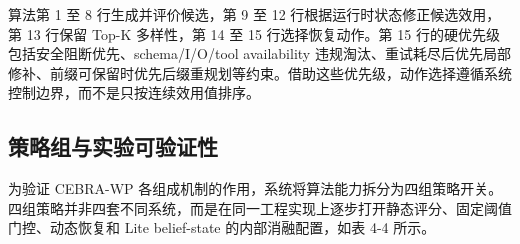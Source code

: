 算法第 1 至 8 行生成并评价候选，第 9 至 12
行根据运行时状态修正候选效用，第 13 行保留 Top-K 多样性，第 14 至 15
行选择恢复动作。第 15 行的硬优先级包括安全阻断优先、schema/I/O/tool
availability
违规淘汰、重试耗尽后优先局部修补、前缀可保留时优先后缀重规划等约束。借助这些优先级，动作选择遵循系统控制边界，而不是只按连续效用值排序。

\subsection{策略组与实验可验证性}\label{ux7b56ux7565ux7ec4ux4e0eux5b9eux9a8cux53efux9a8cux8bc1ux6027}

为验证 CEBRA-WP
各组成机制的作用，系统将算法能力拆分为四组策略开关。四组策略并非四套不同系统，而是在同一工程实现上逐步打开静态评分、固定阈值门控、动态恢复和
Lite belief-state 的内部消融配置，如表 4-4 所示。

